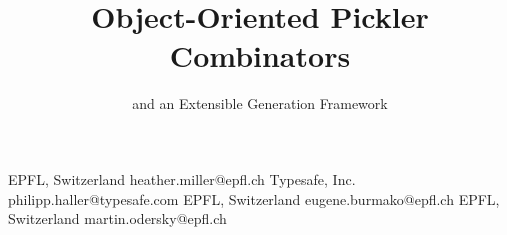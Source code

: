 \documentclass[preprint,10pt]{sigplanconf}
\theoremstyle{definition}
\theoremstyle{definition}
\begin{document}
\setmainfont[Mapping=tex-text]{Times New Roman}
\setmonofont[Scale=0.8,BoldFont={Consolas Bold}]{Consolas}

\copyrightdata{[to be supplied]}


\title{Object-Oriented Pickler Combinators}
\subtitle{and an Extensible Generation Framework}

           {EPFL, Switzerland}
           {heather.miller@epfl.ch}
           {Typesafe, Inc.}
           {philipp.haller@typesafe.com}
           {EPFL, Switzerland}
           {eugene.burmako@epfl.ch}
           {EPFL, Switzerland}
           {martin.odersky@epfl.ch}

\maketitle
\end{document}
